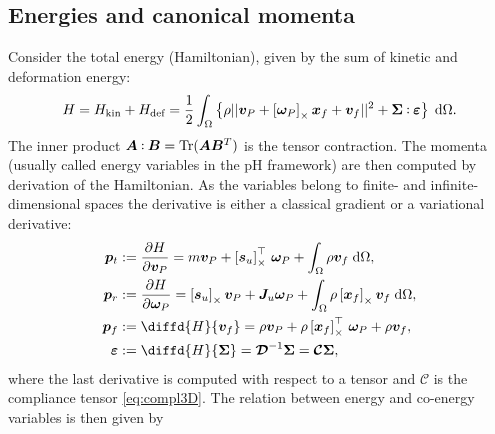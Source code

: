 \subsection{Energies and canonical momenta}
Consider the total energy (Hamiltonian), given by the sum of kinetic and deformation energy:
\begin{equation}
\label{eq:H}
H = H_{\text{kin}} + H_{\text{def}}= \frac{1}{2} \int_{\Omega} \left\{\rho ||\bm{v}_P + \crmat{\bm{\omega}_P} \bm{x}_f + {\bm{v}}_f||^2 + \bm\Sigma \cddot \bm\varepsilon \right\}  \d{\Omega}.
\end{equation}
The inner product $\bm{A} \cddot \bm{B} = \Tr(\bm{A} \bm{B}^T)$ is the tensor contraction.  
The momenta (usually called energy variables in the pH framework) are then computed by derivation of the Hamiltonian. As the variables belong to finite- and infinite-dimensional spaces the derivative is either a classical gradient or a variational derivative:
\begin{equation}
\label{eq:momenta}
\begin{aligned}
\bm{p}_t &:= \diffp{H}{\bm{v}_P} = m \bm{v}_P + \crmat{\bm{s}_u}^\top \, \bm\omega_P + \int_{\Omega} \rho \bm{v}_f \d{\Omega}, \\
\bm{p}_r &:= \diffp{H}{\bm\omega_P} = \crmat{\bm{s}_u} \bm{v}_P + \bm{J}_u \bm\omega_P + \int_{\Omega} \rho \crmat{\bm{x}_f} \bm{v}_f \d{\Omega}, \\
\bm{p}_f &:= \diffd{H}{\bm{v}_f} = \rho \bm{v}_P + \rho \crmat{\bm{x}_f}^\top \, \bm\omega_P + \rho \bm{v}_f, \\
\bm\varepsilon &:= \diffd{H}{\bm\Sigma} = \bm{\mathcal{D}}^{-1} \bm\Sigma= \bm{\mathcal{C}} \bm\Sigma,
\end{aligned}
\end{equation}
where the last derivative is computed with respect to a tensor and $\bm{\mathcal{C}}$ is the compliance tensor \eqref{eq:compl3D}. The relation between energy and co-energy variables is then given by
